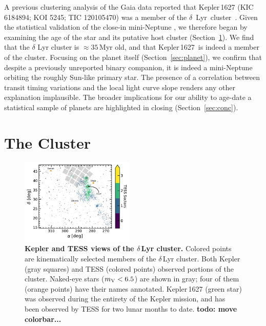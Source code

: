 \documentclass[12pt,modern,twocolumn,tighten]{aastex63}
\newcommand{\cn}{$\delta$~Lyr\ cluster} %
\newcommand{\sn}{Kepler\,1627} %
\begin{document}
A previous clustering analysis of the Gaia data
reported that
Kepler\,1627 (KIC 6184894; KOI 5245; TIC 120105470) was a member of the
\cn\ \citep{kounkel_untangling_2019}.
Given the statistical validation of the close-in mini-Neptune
\citep{2012ApJS..199...24T,morton_false_2016,thompson_planetary_2018}, we therefore began by examining the age of
the star and its putative host cluster (Section~\ref{sec:cluster}). 
We find that the $\delta$ Lyr cluster is $\approx35$\,Myr old, and
that \sn\ is indeed a member of the cluster.
Focusing on the planet itself (Section~\ref{sec:planet}), we confirm
that despite a previously unreported binary companion, it is indeed a
mini-Neptune orbiting the roughly Sun-like primary star.
The presence of a correlation between transit timing variations and
the local light curve slope renders any other explanation implausible.
The broader implications for our ability to age-date a statistical
sample of planets are highlighted in closing (Section~\ref{sec:conc}).


\section{The Cluster}
\label{sec:cluster}

\begin{figure}[t]
	\begin{center}
		\leavevmode
		\includegraphics[width=0.48\textwidth]{f2.pdf}
	\end{center}
	\vspace{-0.7cm}
	\caption{
    {\bf Kepler and TESS views of the $\delta$\,Lyr cluster.} Colored
    points are kinematically selected members of the $\delta$\,Lyr
    cluster.  Both Kepler (gray squares) and TESS (colored points)
    observed portions of the cluster.  Naked-eye stars ($m_{\rm
    V}<6.5$) are shown in gray; four of them (orange points) have
    their names annotated.  Kepler\,1627 (green star) was observed
    during the entirety of the Kepler mission, and has been observed
    by TESS for two lunar months to date.
    {\bf todo: move colorbar...}
		\label{fig:skychart}
	}
\end{figure}
\end{document}

